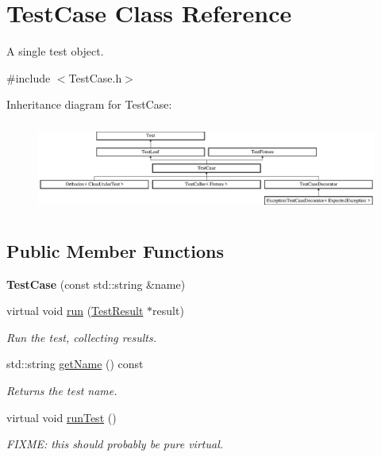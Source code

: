 \hypertarget{class_test_case}{}\section{Test\+Case Class Reference}
\label{class_test_case}


A single test object.  




{\ttfamily \#include $<$Test\+Case.\+h$>$}

Inheritance diagram for Test\+Case\+:\begin{figure}[H]
\begin{center}
\leavevmode
\includegraphics[height=2.962963cm]{class_test_case}
\end{center}
\end{figure}
\subsection*{Public Member Functions}
\begin{DoxyCompactItemize}
\item 
{\bfseries Test\+Case} (const std\+::string \&name)\hypertarget{class_test_case_af81ee40f823e03175e2f2b965ff3661a}{}\label{class_test_case_af81ee40f823e03175e2f2b965ff3661a}

\item 
virtual void \hyperlink{class_test_case_a6bc50d62de5b2d0addf9b0167e34b134}{run} (\hyperlink{class_test_result}{Test\+Result} $\ast$result)\hypertarget{class_test_case_a6bc50d62de5b2d0addf9b0167e34b134}{}\label{class_test_case_a6bc50d62de5b2d0addf9b0167e34b134}

\begin{DoxyCompactList}\small\item\em Run the test, collecting results. \end{DoxyCompactList}\item 
std\+::string \hyperlink{class_test_case_a833448555e5ce90d826f2b411f47ec3d}{get\+Name} () const 
\begin{DoxyCompactList}\small\item\em Returns the test name. \end{DoxyCompactList}\item 
virtual void \hyperlink{class_test_case_a6b55957ac1dfef01e5d9fa2475676f34}{run\+Test} ()\hypertarget{class_test_case_a6b55957ac1dfef01e5d9fa2475676f34}{}\label{class_test_case_a6b55957ac1dfef01e5d9fa2475676f34}

\begin{DoxyCompactList}\small\item\em F\+I\+X\+ME\+: this should probably be pure virtual. \end{DoxyCompactList}\end{DoxyCompactItemize}
